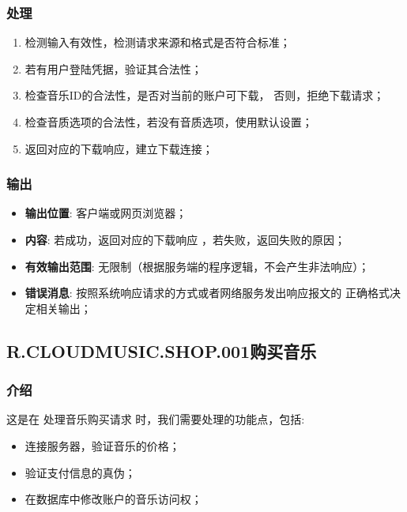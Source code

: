 \begin{enumerate}
\subsubsection{处理}
	\begin{enumerate}
		\item 检测输入有效性，检测请求来源和格式是否符合标准；
		\item 若有用户登陆凭据，验证其合法性；
		\item 检查音乐ID的合法性，是否对当前的账户可下载，
			否则，拒绝下载请求；
		\item 检查音质选项的合法性，若没有音质选项，使用默认设置；
		\item 返回对应的下载响应，建立下载连接；
	\end{enumerate}
\subsubsection{输出}
\begin{itemize}
	\item \textbf{输出位置}: 客户端或网页浏览器；
	\item \textbf{内容}: 若成功，返回对应的下载响应 ，若失败，返回失败的原因；
	\item \textbf{有效输出范围}: 无限制（根据服务端的程序逻辑，不会产生非法响应）；
	\item \textbf{错误消息}: 按照系统响应请求的方式或者网络服务发出响应报文的
		正确格式决定相关输出；
\end{itemize}

\subsection{R.CLOUDMUSIC.SHOP.001购买音乐}
\subsubsection{介绍}
	这是在 处理音乐购买请求 时，我们需要处理的功能点，包括: 
	\begin{itemize}
		\item 连接服务器，验证音乐的价格；
		\item 验证支付信息的真伪；
		\item 在数据库中修改账户的音乐访问权；
	\end{itemize}

\end{enumerate}
